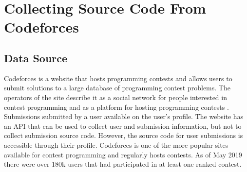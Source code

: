 \documentclass[12pt]{article}
\begin{document}
\section{Collecting Source Code From Codeforces}

\subsection{Data Source}
\begin{sloppypar}
Codeforces is a website that hosts programming contests and allows users to submit solutions to a large database of programming contest problems. The operators of the site describe it as a social network for people interested in contest programming and as a platform for hosting programming contests \cite{WEBSITE:CF1}. Submissions submitted by a user available on the user's profile. The website has an API that can be used to collect user and submission information, but not to collect submission source code. However, the source code for user submissions is accessible through their profile. Codeforces is one of the more popular sites available for contest programming and regularly hosts contests. As of May 2019 there were over 180k users that had participated in at least one ranked contest.
\end{sloppypar}

\end{document}
